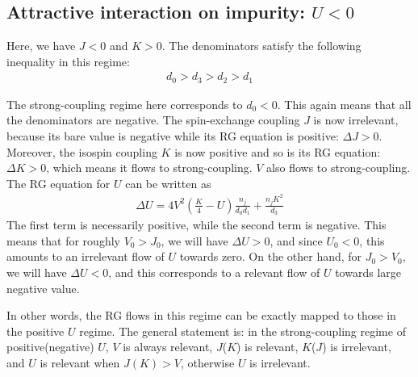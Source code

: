 \documentclass{report}
\numberwithin{equation}{section}
\begin{document}
\subsection{Attractive interaction on impurity: \(U<0\)}
Here, we have \(J<0\) and \(K>0\). The denominators satisfy the following inequality in this regime:
\begin{equation}\begin{aligned}
	d_0 > d_3 > d_2 > d_1
\end{aligned}\end{equation}

The strong-coupling regime here corresponds to \(d_0 < 0\). This again means that all the denominators are negative. The spin-exchange coupling \(J\) is now irrelevant, because its bare value is negative while its RG equation is positive: \(\Delta J>0\). Moreover, the isospin coupling \(K\) is now positive and so is its RG equation: \(\Delta K>0\), which means it flows to strong-coupling. \(V\) also flows to strong-coupling. The RG equation for \(U\) can be written as
\begin{equation}\begin{aligned}
	\Delta U = 4V^2\left(\frac{K}{4} - U\right)\frac{n_j}{d_0 d_1} + \frac{n_j K^2}{d_3}
\end{aligned}\end{equation}
The first term is necessarily positive, while the second term is negative. This means that for roughly \(V_0 > J_0\), we  will have \(\Delta U > 0\), and since \(U_0 < 0\), this amounts to an irrelevant flow of \(U\) towards zero. On the other hand, for \(J_0 > V_0\), we will have \(\Delta U < 0\), and this corresponds to a relevant flow of \(U\) towards large negative value.

In other words, the RG flows in this regime can be exactly mapped to those in the positive \(U\) regime. The general statement is: in the strong-coupling regime of positive(negative) \(U\), \(V\) is always relevant, \(J\)(\(K\)) is relevant, \(K\)(\(J\)) is irrelevant, and \(U\) is relevant when \(J(K) > V\), otherwise \(U\) is irrelevant.
\end{document}
